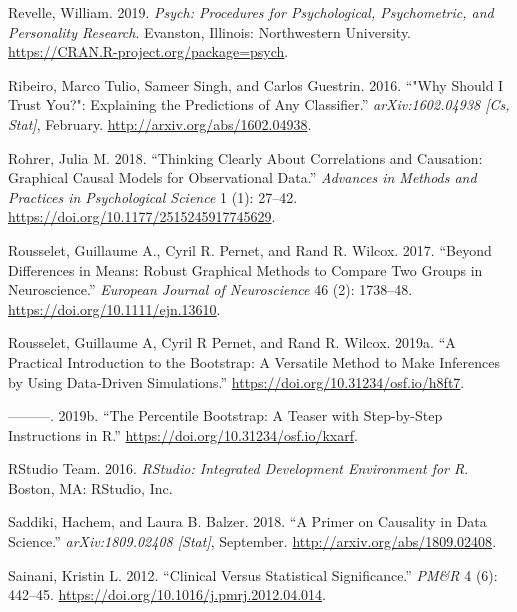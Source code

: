 \documentclass[
]{book}
\newlength{\cslhangindent}
\newenvironment{cslreferences}%
  {\setlength{\parindent}{0pt}%
  \everypar{\setlength{\hangindent}{\cslhangindent}}\ignorespaces}%
  {\par}
\begin{document}
\begin{cslreferences}
\leavevmode\hypertarget{ref-R-psych}{}%
Revelle, William. 2019. \emph{Psych: Procedures for Psychological, Psychometric, and Personality Research}. Evanston, Illinois: Northwestern University. \url{https://CRAN.R-project.org/package=psych}.

\leavevmode\hypertarget{ref-ribeiroWhyShouldTrust2016}{}%
Ribeiro, Marco Tulio, Sameer Singh, and Carlos Guestrin. 2016. ``"Why Should I Trust You?": Explaining the Predictions of Any Classifier.'' \emph{arXiv:1602.04938 {[}Cs, Stat{]}}, February. \url{http://arxiv.org/abs/1602.04938}.

\leavevmode\hypertarget{ref-rohrerThinkingClearlyCorrelations2018}{}%
Rohrer, Julia M. 2018. ``Thinking Clearly About Correlations and Causation: Graphical Causal Models for Observational Data.'' \emph{Advances in Methods and Practices in Psychological Science} 1 (1): 27--42. \url{https://doi.org/10.1177/2515245917745629}.

\leavevmode\hypertarget{ref-rousseletDifferencesMeansRobust2017}{}%
Rousselet, Guillaume A., Cyril R. Pernet, and Rand R. Wilcox. 2017. ``Beyond Differences in Means: Robust Graphical Methods to Compare Two Groups in Neuroscience.'' \emph{European Journal of Neuroscience} 46 (2): 1738--48. \url{https://doi.org/10.1111/ejn.13610}.

\leavevmode\hypertarget{ref-rousseletPracticalIntroductionBootstrap2019}{}%
Rousselet, Guillaume A, Cyril R Pernet, and Rand R. Wilcox. 2019a. ``A Practical Introduction to the Bootstrap: A Versatile Method to Make Inferences by Using Data-Driven Simulations.'' \url{https://doi.org/10.31234/osf.io/h8ft7}.

\leavevmode\hypertarget{ref-rousseletPercentileBootstrapTeaser2019}{}%
---------. 2019b. ``The Percentile Bootstrap: A Teaser with Step-by-Step Instructions in R.'' \url{https://doi.org/10.31234/osf.io/kxarf}.

\leavevmode\hypertarget{ref-rstudioteamRStudioIntegratedDevelopment2016}{}%
RStudio Team. 2016. \emph{RStudio: Integrated Development Environment for R}. Boston, MA: RStudio, Inc.

\leavevmode\hypertarget{ref-saddikiPrimerCausalityData2018}{}%
Saddiki, Hachem, and Laura B. Balzer. 2018. ``A Primer on Causality in Data Science.'' \emph{arXiv:1809.02408 {[}Stat{]}}, September. \url{http://arxiv.org/abs/1809.02408}.

\leavevmode\hypertarget{ref-sainaniClinicalStatisticalSignificance2012}{}%
Sainani, Kristin L. 2012. ``Clinical Versus Statistical Significance.'' \emph{PM\&R} 4 (6): 442--45. \url{https://doi.org/10.1016/j.pmrj.2012.04.014}.


\end{cslreferences}
\end{document}
